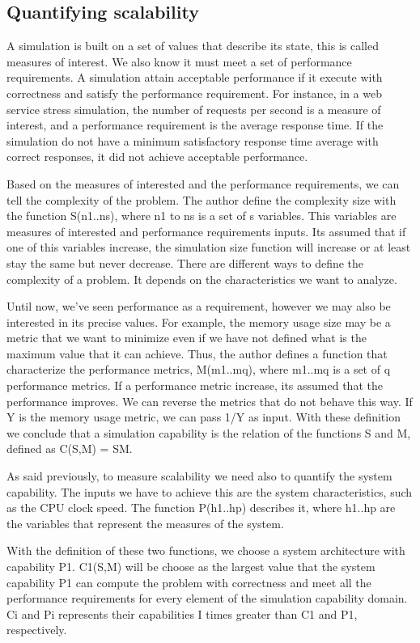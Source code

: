 \subsection{Quantifying scalability}

A simulation is built on a set of values that describe its state, this is called measures of interest. We also know it must meet a set of performance requirements. A simulation attain acceptable performance if it execute with correctness and satisfy the performance requirement. For instance, in a web service stress simulation, the number of requests per second is a measure of interest, and a performance requirement is the average response time. If the simulation do not have a minimum satisfactory response time average with correct responses, it did not achieve acceptable performance. 

Based on the measures of interested and the performance requirements, we can tell the complexity of the problem. The author define the complexity size with the function S(n1..ns), where n1 to ns is a set of s variables. This variables are measures of interested and performance requirements inputs. Its assumed that if one of this variables increase, the simulation size function will increase or at least stay the same but never decrease. There are different ways to define the complexity of a problem. It depends on the characteristics we want to analyze.

Until now, we've seen performance as a requirement, however we may also be interested in its precise values. For example, the memory usage size may be a metric that we want to minimize even if we have not defined what is the maximum value that it can achieve. Thus, the author defines a function that characterize the performance metrics, M(m1..mq), where m1..mq is a set of q performance metrics. If a performance metric increase, its assumed that the performance improves. We can reverse the metrics that do not behave this way. If Y is the memory usage metric, we can pass 1/Y as input. With these definition we conclude that a simulation capability is the relation of the functions S and M, defined as C(S,M) = SM.

As said previously, to measure scalability we need also to quantify the system capability. The inputs we have to achieve this are the system characteristics, such as the CPU clock speed. The function P(h1..hp) describes it, where h1..hp are the variables that represent the measures of the system.

With the definition of these two functions, we choose a system architecture with capability P1. C1(S,M) will be choose as the largest value that the system capability P1 can compute the problem with correctness and meet all the performance requirements for every element of the simulation capability domain. Ci and Pi represents their capabilities I times greater than C1 and P1, respectively.

